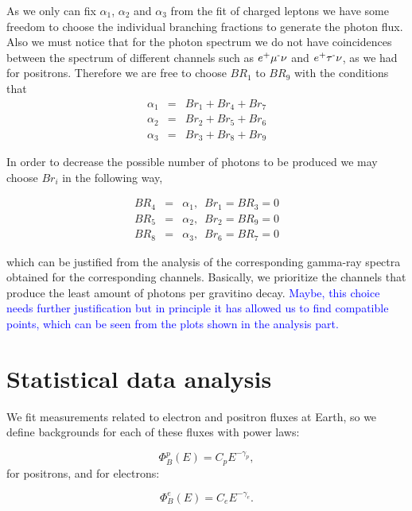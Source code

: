\documentclass[a4paper,11pt]{article}
\newcommand*{\blue}{\textcolor{blue}}
\begin{document}
As we only can fix $\alpha_{1}$, $\alpha_{2}$ and $\alpha_{3}$ from the fit of charged leptons we have some freedom to choose the
individual branching fractions to generate the photon flux. Also we must notice that for the photon spectrum we do not have coincidences
between the spectrum of different channels such as $e\text{\textsuperscript{+}}\mu\text{\textsuperscript{-}}\nu$
and $e\text{\textsuperscript{+}}\tau\text{\textsuperscript{-}}\nu$,
as we had for positrons. Therefore we are free to choose $BR{}_{1}$
to $BR_{9}$ with the conditions that
\begin{eqnarray*}
\alpha_{1} & = & Br_{1}+Br_{4}+Br_{7}\\
\alpha_{2} & = & Br_{2}+Br_{5}+Br_{6}\\
\alpha_{3} & = & Br_{3}+Br_{8}+Br_{9}
\end{eqnarray*}


In order to decrease the possible number of photons to be produced we may choose $Br_{i}$ in the following way,

\begin{eqnarray*}
BR_{4} & = & \alpha_{1},\,\,\,Br_{1}=BR_{3}=0\\
BR_{5} & = & \alpha_{2},\,\,\,Br_{2}=BR_{9}=0\\
BR_{8} & = & \alpha_{3},\,\,\,Br_{6}=BR_{7}=0
\end{eqnarray*}

\noindent which can be justified from the analysis of the corresponding gamma-ray spectra obtained for the corresponding channels. Basically,
we prioritize the channels that produce the least amount of photons per gravitino decay. \blue{Maybe, this choice needs further justification but in principle it has allowed us to find compatible points, which can be seen from the plots shown in the analysis part.} 

\section{Statistical data analysis}

We fit measurements related to electron and positron fluxes at Earth, so we define backgrounds for each of these fluxes with power laws:

\begin{equation}
\Phi_B^p(E) = C_p E^{-\gamma_p}, 
\end{equation}
for positrons, and for electrons:

\begin{equation}
\Phi_B^e(E) = C_e E^{-\gamma_e}.
\end{equation}
\end{document}
